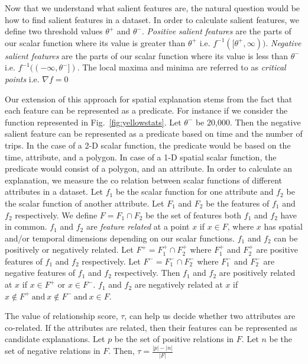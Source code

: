 Now that we understand what salient features are, the natural question would be how to find salient features in a dataset. In order to calculate salient features, we define two threshold values $\theta^+$ and $\theta^-$. \textit{Positive salient features} are the parts of our scalar function where its value is greater than $\theta^+$ i.e. $f^{-1}([\theta^+, \infty))$. \textit{Negative salient features} are the parts of our scalar function where its value is less than $\theta^-$ i.e. $f^{-1}((-\infty, \theta^-])$. The local maxima and minima are referred to as \textit{critical points} i.e. $\nabla f = 0$

Our extension of this approach for spatial explanation stems from the fact that each feature can be represented as a predicate. For instance if we consider the function represented in Fig.~\ref{fig:yellowstats}. Let $\theta^-$ be 20,000. Then the negative salient feature can be represented as a predicate based on time and the number of trips. In the case of a 2-D scalar function, the predicate would be based on the time, attribute, and a polygon. In case of a 1-D spatial scalar function, the predicate would consist of a polygon, and an attribute. In order to calculate an explanation, we measure the co relation between scalar functions of different attributes in a dataset. Let $f_1$ be the scalar function for one attribute and $f_2$ be the scalar function of another attribute. Let $F_1$ and $F_2$ be the features of $f_1$ and $f_2$ respectively. We define $F = F_1 \cap F_2$ be the set of features both $f_1$ and $f_2$ have in common. $f_1$ and $f_2$ are \textit{feature related} at a point $x$ if $x \in F$, where $x$ has spatial and/or temporal dimensions depending on our scalar functions. $f_1$ and $f_2$ can be positively or negatively related. Let $F^+ = F_1^+ \cap F_2^+$ where $F_1^+$ and $F_2^+$ are positive features of $f_1$ and $f_2$ respectively. Let $F^- = F_1^- \cap F_2^-$ where $F_1^-$ and $F_2^-$ are negative features of $f_1$ and $f_2$ respectively. Then $f_1$ and $f_2$ are positively related at $x$ if $x \in F^+$  or $x \in F^-$. $f_1$ and $f_2$ are negatively related at $x$ if $x \notin F^+\ \text{and}\ x \notin F^-\ \text{and}\ x\in F$.

The value of relationship score, $\tau$, can help us decide whether two attributes are co-related. If the attributes are related, then their features can be represented as candidate explanations. Let $p$ be the set of positive relations in $F$. Let $n$ be the set of negative relations in $F$. Then,
$\tau = \frac{|p|-|n|}{|F|}$



